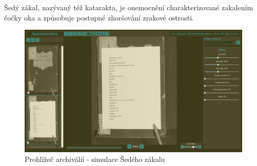 \newpage
\noindent
Šedý zákal, nazývaný též katarakta, je onemocnění charakterizované zakalením čočky oka a způsobuje postupné zhoršování zrakové ostrosti.
\begin{figure}[htbp]
\centering
    \includegraphics[scale=.35]{obrazky-figures/testing/figma-eye-defects/Gallery Page - Yellowing.png}
    \caption{Prohlížeč archiválií - simulace Šedého zákalu}
\end{figure}